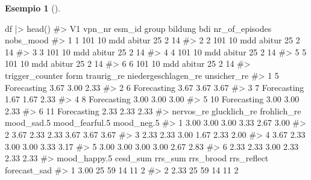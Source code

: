 \documentclass[
  letterpaper,
  DIV=11,
  numbers=noendperiod]{scrreprt}
\newenvironment{Shaded}{\begin{snugshade}}{\end{snugshade}}
\newcommand{\CommentTok}[1]{\textcolor[rgb]{0.37,0.37,0.37}{#1}}
\newcommand{\FunctionTok}[1]{\textcolor[rgb]{0.28,0.35,0.67}{#1}}
\newcommand{\NormalTok}[1]{\textcolor[rgb]{0.00,0.23,0.31}{#1}}
\newcommand{\SpecialCharTok}[1]{\textcolor[rgb]{0.37,0.37,0.37}{#1}}
\theoremstyle{definition}
\newtheorem{example}{Esempio}[chapter]
\theoremstyle{remark}
\begin{document}
\begin{example}[]
\begin{Shaded}
\begin{Highlighting}[]
\NormalTok{df }\SpecialCharTok{|\textgreater{}} \FunctionTok{head}\NormalTok{()}
\CommentTok{\#\textgreater{}   V1 vpn\_nr esm\_id group bildung bdi nr\_of\_episodes nobs\_mood}
\CommentTok{\#\textgreater{} 1  1    101     10   mdd  abitur  25              2        14}
\CommentTok{\#\textgreater{} 2  2    101     10   mdd  abitur  25              2        14}
\CommentTok{\#\textgreater{} 3  3    101     10   mdd  abitur  25              2        14}
\CommentTok{\#\textgreater{} 4  4    101     10   mdd  abitur  25              2        14}
\CommentTok{\#\textgreater{} 5  5    101     10   mdd  abitur  25              2        14}
\CommentTok{\#\textgreater{} 6  6    101     10   mdd  abitur  25              2        14}
\CommentTok{\#\textgreater{}   trigger\_counter        form traurig\_re niedergeschlagen\_re unsicher\_re}
\CommentTok{\#\textgreater{} 1               5 Forecasting       3.67                3.00        2.33}
\CommentTok{\#\textgreater{} 2               6 Forecasting       3.67                3.67        3.67}
\CommentTok{\#\textgreater{} 3               7 Forecasting       1.67                1.67        2.33}
\CommentTok{\#\textgreater{} 4               8 Forecasting       3.00                3.00        3.00}
\CommentTok{\#\textgreater{} 5              10 Forecasting       3.00                3.00        2.33}
\CommentTok{\#\textgreater{} 6              11 Forecasting       2.33                2.33        2.33}
\CommentTok{\#\textgreater{}   nervos\_re glucklich\_re frohlich\_re mood\_sad.5 mood\_fearful.5 mood\_neg.5}
\CommentTok{\#\textgreater{} 1      3.00         3.00        3.00       3.33           2.67       3.00}
\CommentTok{\#\textgreater{} 2      3.67         2.33        2.33       3.67           3.67       3.67}
\CommentTok{\#\textgreater{} 3      2.33         2.33        3.00       1.67           2.33       2.00}
\CommentTok{\#\textgreater{} 4      3.67         2.33        3.00       3.00           3.33       3.17}
\CommentTok{\#\textgreater{} 5      3.00         3.00        3.00       3.00           2.67       2.83}
\CommentTok{\#\textgreater{} 6      2.33         2.33        3.00       2.33           2.33       2.33}
\CommentTok{\#\textgreater{}   mood\_happy.5 cesd\_sum rrs\_sum rrs\_brood rrs\_reflect forecast\_sad}
\CommentTok{\#\textgreater{} 1         3.00       25      59        14          11            2}
\CommentTok{\#\textgreater{} 2         2.33       25      59        14          11            2}

\end{Highlighting}
\end{Shaded}
\end{example}
\end{document}
